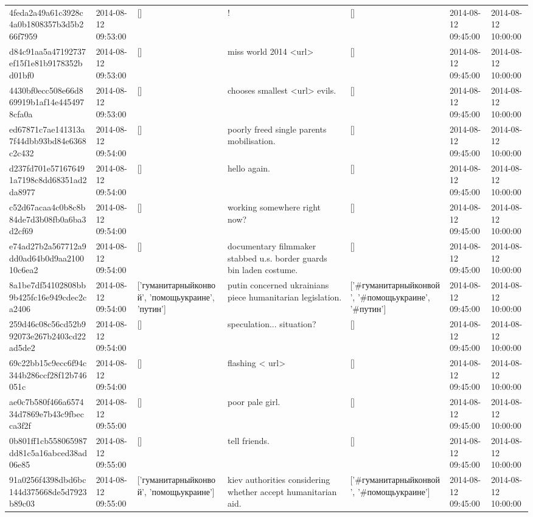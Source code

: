 \begin{tabular}{lllllll}
4feda2a49a61c3928c4a0b1808357b3d5b266f7959 & 2014-08-12 09:53:00 & [] & ! & [] & 2014-08-12 09:45:00 & 2014-08-12 10:00:00 \\
d84c91aa5a47192737ef15f1e81b9178352bd01bf0 & 2014-08-12 09:53:00 & [] & miss world 2014 <url> & [] & 2014-08-12 09:45:00 & 2014-08-12 10:00:00 \\
4430bf0ecc508e66d869919b1af14e4454978cfa0a & 2014-08-12 09:53:00 & [] & chooses smallest <url> evils. & [] & 2014-08-12 09:45:00 & 2014-08-12 10:00:00 \\
ed67871c7ae141313a7f44dbb93bd84e6368c2c432 & 2014-08-12 09:54:00 & [] & poorly freed single parents mobilisation. & [] & 2014-08-12 09:45:00 & 2014-08-12 10:00:00 \\
d237fd701e571676491a7198c8dd68351ad2da8977 & 2014-08-12 09:54:00 & [] & hello again. & [] & 2014-08-12 09:45:00 & 2014-08-12 10:00:00 \\
c52d67acaa4c0b8c8b84de7d3b08fb0a6ba3d2cf69 & 2014-08-12 09:54:00 & [] & working somewhere right now? & [] & 2014-08-12 09:45:00 & 2014-08-12 10:00:00 \\
e74ad27b2a567712a9dd0ad64b0d9aa210010c6ea2 & 2014-08-12 09:54:00 & [] & documentary filmmaker stabbed u.s. border guards bin laden costume. & [] & 2014-08-12 09:45:00 & 2014-08-12 10:00:00 \\
8a1be7df54102808bb9b425fc16e949cdec2ca2406 & 2014-08-12 09:54:00 & ['гуманитарныйконвой', 'помощьукраине', 'путин'] & putin concerned ukrainians piece humanitarian legislation. & ['#гуманитарныйконвой', '#помощьукраине', '#путин'] & 2014-08-12 09:45:00 & 2014-08-12 10:00:00 \\
259d46c08c56cd52b992073e267b2403cd22ad5de2 & 2014-08-12 09:54:00 & [] & speculation... situation? & [] & 2014-08-12 09:45:00 & 2014-08-12 10:00:00 \\
69c22bb15c9ecc6f94c344b286ccf28f12b746051c & 2014-08-12 09:54:00 & [] & flashing < url> & [] & 2014-08-12 09:45:00 & 2014-08-12 10:00:00 \\
ae0c7b580f466a657434d7869e7b43c9fbecca3f2f & 2014-08-12 09:55:00 & [] & poor pale girl. & [] & 2014-08-12 09:45:00 & 2014-08-12 10:00:00 \\
0b801ff1cb558065987dd81c5a16abced38ad06e85 & 2014-08-12 09:55:00 & [] & tell friends. & [] & 2014-08-12 09:45:00 & 2014-08-12 10:00:00 \\
91a0256f4398dbd6bc144d375668de5d7923b89c03 & 2014-08-12 09:55:00 & ['гуманитарныйконвой', 'помощьукраине'] & kiev authorities considering whether accept humanitarian aid. & ['#гуманитарныйконвой', '#помощьукраине'] & 2014-08-12 09:45:00 & 2014-08-12 10:00:00 \\

\end{tabular}
